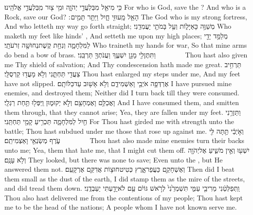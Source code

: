 {כִּ֥י מִי\maqqaf אֵ֖ל מִבַּלְעֲדֵ֣י יְהֹוָ֑ה וּמִ֥י צ֖וּר מִֽבַּלְעֲדֵ֥י אֱלֹהֵֽינוּ׃}
{For who is God, save the \lord? And who is a Rock, save our God?}
{הָאֵ֥ל מָֽעוּזִּ֖י חָ֑יִל וַיַּתֵּ֥ר תָּמִ֖ים ׃}
{The God who is my strong fortress, And who letteth my way go forth straight;}
{מְשַׁוֶּ֥ה  כָּאַיָּל֑וֹת וְעַ֥ל בָּמֹתַ֖י יַעֲמִדֵֽנִי׃}
{Who maketh my feet like hinds’ , And setteth me upon my high places;}
{מְלַמֵּ֥ד יָדַ֖י לַמִּלְחָמָ֑ה וְנִחַ֥ת קֶשֶׁת\maqqaf נְחוּשָׁ֖ה זְרֹעֹתָֽי׃}
{Who traineth my hands for war, So that mine arms do bend a bow of brass.}
{וַתִּתֶּן\maqqaf לִ֖י מָגֵ֣ן יִשְׁעֶ֑ךָ וַעֲנֹתְךָ֖ תַּרְבֵּֽנִי׃        }
{Thou hast also given me Thy shield of salvation; And Thy condescension hath made me great.}
{תַּרְחִ֥יב צַעֲדִ֖י תַּחְתֵּ֑נִי וְלֹ֥א מָעֲד֖וּ קַרְסֻלָּֽי׃}
{Thou hast enlarged my steps under me, And my feet have not slipped.}
{אֶרְדְּפָ֥ה אֹיְבַ֖י וָאַשְׁמִידֵ֑ם וְלֹ֥א אָשׁ֖וּב עַד\maqqaf כַּלּוֹתָֽם׃}
{I have pursued mine enemies, and destroyed them; Neither did I turn back till they were consumed.}
{וָאֲכַלֵּ֥ם וָאֶמְחָצֵ֖ם וְלֹ֣א יְקוּמ֑וּן וַֽיִּפְּל֖וּ תַּ֥חַת רַגְלָֽי׃}
{And I have consumed them, and smitten them through, that they cannot arise; Yea, they are fallen under my feet.}
{וַתַּזְרֵ֥נִי חַ֖יִל לַמִּלְחָמָ֑ה תַּכְרִ֥יעַ קָמַ֖י תַּחְתֵּֽנִי׃}
{For Thou hast girded me with strength unto the battle; Thou hast subdued under me those that rose up against me.}
{וְאֹ֣יְבַ֔י תַּ֥תָּה לִּ֖י עֹ֑רֶף מְשַׂנְאַ֖י וָאַצְמִיתֵֽם׃        }
{Thou hast also made mine enemies turn their backs unto me; Yea, them that hate me, that I might cut them off.}
{יִשְׁע֖וּ וְאֵ֣ין מֹשִׁ֑יעַ אֶל\maqqaf יְהֹוָ֖ה וְלֹ֥א עָנָֽם׃}
{They looked, but there was none to save; Even unto the \lord, but He answered them not.}
{וְאֶשְׁחָקֵ֖ם כַּעֲפַר\maqqaf אָ֑רֶץ כְּטִיט\maqqaf חוּצ֥וֹת אֲדִקֵּ֖ם אֶרְקָעֵֽם׃}
{Then did I beat them small as the dust of the earth, I did stamp them as the mire of the streets, and did tread them down.}
{וַֽתְּפַלְּטֵ֔נִי מֵרִיבֵ֖י עַמִּ֑י תִּשְׁמְרֵ֙נִי֙ לְרֹ֣אשׁ גּוֹיִ֔ם עַ֥ם לֹא\maqqaf יָדַ֖עְתִּי יַעַבְדֻֽנִי׃}
{Thou also hast delivered me from the contentions of my people; Thou hast kept me to be the head of the nations; A people whom I have not known serve me.}
